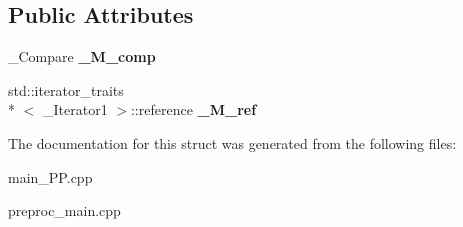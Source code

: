 \subsection*{Public Attributes}
\begin{DoxyCompactItemize}
\item 
\hypertarget{struct____gnu__cxx_1_1____ops_1_1__Iter__comp__to__iter_a9abfd3a3343613536ebde42c55f8ed46}{\+\_\+\+Compare {\bfseries \+\_\+\+M\+\_\+comp}}\label{struct____gnu__cxx_1_1____ops_1_1__Iter__comp__to__iter_a9abfd3a3343613536ebde42c55f8ed46}

\item 
\hypertarget{struct____gnu__cxx_1_1____ops_1_1__Iter__comp__to__iter_a3dc01c57f4012ad34377143ba6c01deb}{std\+::iterator\+\_\+traits\\*
$<$ \+\_\+\+Iterator1 $>$\+::reference {\bfseries \+\_\+\+M\+\_\+ref}}\label{struct____gnu__cxx_1_1____ops_1_1__Iter__comp__to__iter_a3dc01c57f4012ad34377143ba6c01deb}

\end{DoxyCompactItemize}


The documentation for this struct was generated from the following files\+:\begin{DoxyCompactItemize}
\item 
main\+\_\+\+P\+P.\+cpp\item 
preproc\+\_\+main.\+cpp\end{DoxyCompactItemize}
